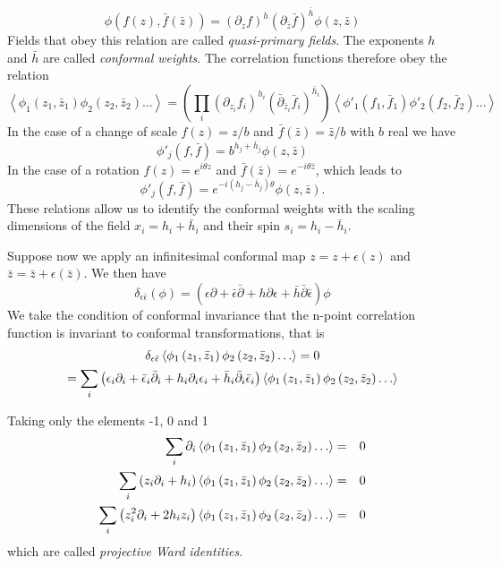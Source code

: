 \begin{equation}
    \phi\left(f\left(z\right),\bar{f}\left(\bar{z}\right)\right)=
    (\partial_{z}f)^{h}(\partial_{\bar{z}}\bar{f})^{\bar{h}}\phi\left(z,\bar{z}\right)
\end{equation}
Fields that obey this relation are called \textit{quasi-primary fields}.
The exponents $h$ and $\bar{h}$ are called \textit{conformal weights}.
The correlation functions therefore obey the relation
\begin{equation}
    \left\langle
        \phi_{1}\left(z_{1},\bar{z}_{1}\right)
        \phi_{2}\left(z_{2},\bar{z}_{2}\right)\ldots
    \right\rangle =
    \left(
        \prod_{i}\left( \partial_{z_{i}}f_{i}\right)^{h_{i}}
        \left(\bar{\partial}_{\bar{z}_{i}}\bar{f}_{i}\right)^{\bar{h}_{i}}
    \right)
    \left\langle
        \phi'_{1}\left(f_{1},\bar{f}_{1}\right)
        \phi'_{2}\left(f_{2},\bar{f}_{2}\right)\ldots
    \right\rangle 
\end{equation}
In the case of a change of scale $f(z)=z/b$ and $\bar{f}(\bar{z})=\bar{z}/b$
with $b$ real we have
\begin{equation}
    \phi'_{j}\left(f,\bar{f}\right)=
    b^{h_{j}+\bar{h}_{j}}\phi\left(z,\bar{z}\right)
\end{equation}
In the case of a rotation $f(z)=e^{i\theta z}$ and
$\bar{f}(\bar{z})=e^{-i\theta \bar{z}}$, which leads to
\begin{equation}
    \phi'_{j}\left(f,\bar{f}\right)=
    e^{-i\left(h_{j}-\bar{h}_{j}\right)\theta}\phi\left(z,\bar{z}\right).
\end{equation}
These relations allow us to identify the conformal weights with the
scaling dimensions of the field $x_i=h_i+\bar{h}_i$ and
their spin $s_i=h_i-\bar{h}_i$.

Suppose now we apply an infinitesimal conformal map $z=z+\epsilon(z)$
and $\bar{z}=\bar{z}+\epsilon(\bar{z})$.
We then have
\begin{equation}
    \delta_{\epsilon\bar{\epsilon}}\left(\phi\right)=
    \left(
        \epsilon\partial+\bar{\epsilon}\bar{\partial}+
        h\partial\epsilon+\bar{h}\bar{\partial}\bar{\epsilon}
    \right)\phi
\end{equation}
We take the condition of conformal invariance that
the n-point correlation function is invariant to conformal
transformations, that is
\begin{multline}
    \delta_{\epsilon\bar{\epsilon}} \left\langle \phi_{1}\left(z_{1},\bar{z}_{1}\right) \phi_{2}\left(z_{2},\bar{z}_{2}\right)\ldots \right\rangle = 0 \\
    = \sum_{i}\left(
        \epsilon_{i}\partial_{i}+
        \bar{\epsilon}_{i}\bar{\partial}_{i}+
        h_{i}\partial_{i}\epsilon_{i}+
        \bar{h}_{i}\bar{\partial}_{i}\bar{\epsilon}_{i}
    \right) \left\langle \phi_{1}\left(z_{1},\bar{z}_{1}\right) \phi_{2}\left(z_{2},\bar{z}_{2}\right)\ldots \right\rangle
\end{multline}

Taking only the elements -1, 0 and 1
\begin{eqnarray}
    \sum_{i}\partial_{i} \left\langle \phi_{1}\left(z_{1},\bar{z}_{1}\right) \phi_{2}\left(z_{2},\bar{z}_{2}\right)\ldots \right\rangle& = & 0 \\
    \sum_{i}\left(z_{i}\partial_{i}+h_{i}\right) \left\langle \phi_{1}\left(z_{1},\bar{z}_{1}\right) \phi_{2}\left(z_{2},\bar{z}_{2}\right)\ldots \right\rangle& = & 0 \\
    \sum_{i}\left(z_{i}^{2}\partial_{i}+2h_{i}z_{i}\right) \left\langle \phi_{1}\left(z_{1},\bar{z}_{1}\right) \phi_{2}\left(z_{2},\bar{z}_{2}\right)\ldots \right\rangle& = & 0
\end{eqnarray}
which are called \textit{projective Ward identities}.
